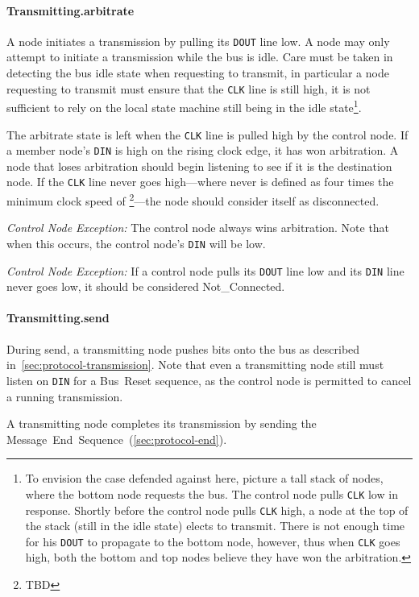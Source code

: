 \paragraph{Transmitting.{\sc arbitrate}}
\label{sec:state-arbitrate}
A node initiates a transmission by pulling its {\tt DOUT} line low. A node may
only attempt to initiate a transmission while the bus is idle. Care must be
taken in detecting the bus idle state when requesting to transmit, in
particular a node requesting to transmit must ensure that the {\tt CLK} line
is still high, it is not sufficient to rely on the local state machine still
being in the {\sc idle} state\footnote{To envision the case defended against
here, picture a tall stack of nodes, where the bottom node requests the bus.
The control node pulls {\tt CLK} low in response. Shortly before the control
node pulls {\tt CLK} high, a node at the top of the stack (still in the {\sc
idle} state) elects to transmit. There is not enough time for his {\tt DOUT}
to propagate to the bottom node, however, thus when {\tt CLK} goes high, both
the bottom and top nodes believe they have won the arbitration.}.

The {\sc arbitrate} state is left when the {\tt CLK} line is pulled high by
the control node. If a member node's {\tt DIN} is high on the rising clock
edge, it has won arbitration. A node that loses arbitration should begin
listening to see if it is the destination node. If the {\tt CLK} line never
goes high---where never is defined as four times the minimum clock speed of
\bus\footnote{TBD}---the node should consider itself as disconnected.

\medskip
\noindent
{\em Control Node Exception:} The control node always wins arbitration. Note
that when this occurs, the control node's {\tt DIN} will be low.

\medskip
\noindent
{\em Control Node Exception:} If a control node pulls its {\tt DOUT} line low
and its {\tt DIN} line never goes low, it should be considered
{\sc Not\_Connected}.

\paragraph{Transmitting.{\sc send}}
During {\sc send}, a transmitting node pushes bits onto the bus as described
in~\ref{sec:protocol-transmission}. Note that even a transmitting node still
must listen on {\tt DIN} for a Bus~Reset sequence, as the control node is
permitted to cancel a running transmission.

A transmitting node completes its transmission by sending the
Message~End~Sequence~(\ref{sec:protocol-end}).

